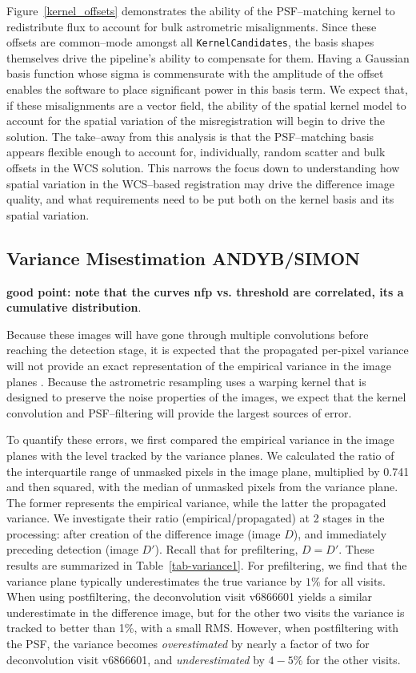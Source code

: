 \documentclass[prd, nofootinbib, floatfix, 11pt,tightenlines,times]{article}
\begin{document}
Figure~\ref{kernel_offsets} demonstrates the ability of the
PSF--matching kernel to redistribute flux to account for bulk
astrometric misalignments.  Since these offsets are common--mode
amongst all {\tt KernelCandidates}, the basis shapes themselves drive
the pipeline's ability to compensate for them.  Having a Gaussian
basis function whose sigma is commensurate with the amplitude of the
offset enables the software to place significant power in this basis
term.  We expect that, if these misalignments are a vector field, the
ability of the spatial kernel model to account for the spatial
variation of the misregistration will begin to drive the solution.
The take--away from this analysis is that the PSF--matching basis
appears flexible enough to account for, individually, random scatter
and bulk offsets in the WCS solution.  This narrows the focus down to
understanding how spatial variation in the WCS--based registration may
drive the difference image quality, and what requirements need to be
put both on the kernel basis and its spatial variation.





\subsection{Variance Misestimation {\bf ANDYB/SIMON}}

{\bf good point: note that the curves nfp vs. threshold are
  correlated, its a cumulative distribution}.

Because these images will have gone through multiple convolutions
before reaching the detection stage, it is expected that the
propagated per-pixel variance will not provide an exact representation
of the empirical variance in the image planes \citep{Price-Stacking}.
Because the astrometric resampling uses a warping kernel that is
designed to preserve the noise properties of the images, we expect
that the kernel convolution and PSF--filtering will provide the largest
sources of error.

To quantify these errors, we first compared the empirical variance in
the image planes with the level tracked by the variance planes.  We
calculated the ratio of the interquartile range of unmasked pixels in
the image plane, multiplied by 0.741 and then squared, with the median
of unmasked pixels from the variance plane.  The former represents the
empirical variance, while the latter the propagated variance.  We
investigate their ratio (empirical/propagated) at 2 stages in the
processing: after creation of the difference image (image $D$), and
immediately preceding detection (image $D'$).  Recall that for
prefiltering, $D = D'$.  These results are summarized in
Table~\ref{tab-variance1}.  For prefiltering, we find that the
variance plane typically underestimates the true variance by $1\%$ for
all visits.  When using postfiltering, the deconvolution visit
v6866601 yields a similar underestimate in the difference image, but
for the other two visits the variance is tracked to better than 1\%,
with a small RMS.  However, when postfiltering with the PSF, the
variance becomes {\it overestimated} by nearly a factor of two for
deconvolution visit v6866601, and {\it underestimated} by $4-5\%$ for
the other visits.
\end{document}
